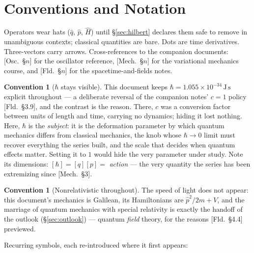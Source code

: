 \documentclass[11pt]{article}
\theoremstyle{plain}
\theoremstyle{definition}
\newtheorem{convention}[theorem]{Convention}
\theoremstyle{remark}
\newcommand{\op}[1]{\hat{#1}}
\begin{document}
\section{Conventions and Notation}
\label{sec:conventions}

Operators wear hats ($\op q$, $\op p$, $\op H$) until
\S\ref{sec:hilbert} declares them safe to remove in unambiguous
contexts; classical quantities are bare. Dots are time derivatives.
Three-vectors carry arrows. Cross-references to the companion
documents: [Osc.\ \S$n$] for the oscillator reference, [Mech.\ \S$n$]
for the variational mechanics course, and [Fld.\ \S$n$] for the
spacetime-and-fields notes.

\begin{convention}[$\hbar$ stays visible]\label{conv:hbar}
This document keeps $\hbar = 1.055\times 10^{-34}\,\mathrm{J\,s}$
explicit throughout --- a deliberate reversal of the companion
notes' $c = 1$ policy [Fld.\ \S3.9], and the contrast is the reason.
There, $c$ was a conversion factor between units of length and time,
carrying no dynamics; hiding it lost nothing. Here, $\hbar$ is the
\emph{subject}: it is the deformation parameter by which quantum
mechanics differs from classical mechanics, the knob whose
$\hbar \to 0$ limit must recover everything the series built, and
the scale that decides when quantum effects matter. Setting it to
$1$ would hide the very parameter under study. Note its dimensions:
$[\hbar] = [q][p] = $ \emph{action} --- the very quantity the series
has been extremizing since [Mech.\ \S3].
\end{convention}

\begin{convention}[Nonrelativistic throughout]\label{conv:nonrel}
The speed of light does not appear: this document's mechanics is
Galilean, its Hamiltonians are $\op p^2/2m + V$, and the marriage of
quantum mechanics with special relativity is exactly the handoff of
the outlook (\S\ref{sec:outlook}) --- quantum \emph{field} theory,
for the reasons [Fld.\ \S4.4] previewed.
\end{convention}

\noindent
Recurring symbols, each re-introduced where it first appears:
\end{document}
